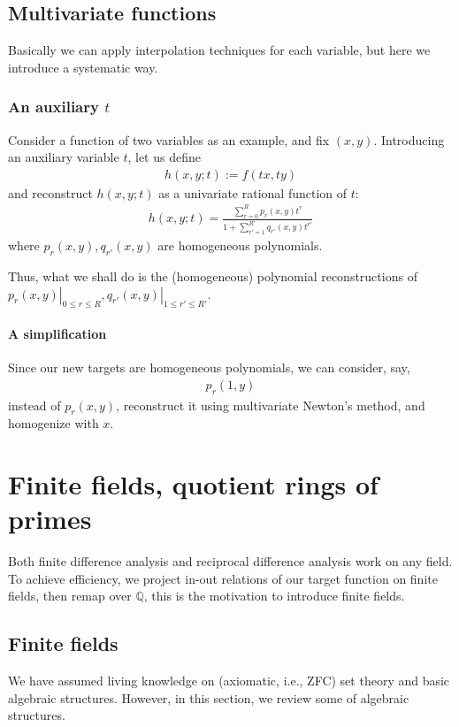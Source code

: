 \documentclass[11pt]{book}
\begin{document}
\section{Multivariate functions}
Basically we can apply interpolation techniques for each variable, but here we introduce a systematic way.

\subsection{An auxiliary $t$}
Consider a function of two variables as an example, and fix $(x,y)$.
Introducing an auxiliary variable $t$, let us define
\begin{eqnarray}
h(x,y;t) := f(tx, ty)
\end{eqnarray}
and reconstruct $h(x,y;t)$ as a univariate rational function of $t$:
\begin{eqnarray}
h(x,y;t) = \frac{\sum_{r=0}^R p_r(x,y) t^r}{1+ \sum_{r'=1}^{R'} q_{r'}(x,y) t^{r'}}
\end{eqnarray}
where $p_r(x,y), q_{r'}(x,y)$ are homogeneous polynomials.

Thus, what we shall do is the (homogeneous) polynomial reconstructions of $\left. p_r(x,y) \right|_{0 \leq r \leq R}, \left. q_{r'}(x,y) \right|_{1 \leq r' \leq R'}$.

\subsubsection{A simplification}
Since our new targets are homogeneous polynomials, we can consider, say,
\begin{eqnarray}
p_r(1, y)
\end{eqnarray}
instead of $p_r(x,y)$, reconstruct it using multivariate Newton's method, and homogenize with $x$.



\chapter{Finite fields, quotient rings of primes}
Both finite difference analysis and reciprocal difference analysis work on any field.
To achieve efficiency, we project in-out relations of our target function on finite fields, then remap over $\mathbb{Q}$, this is the motivation to introduce finite fields.

\section{Finite fields}
We have assumed living knowledge on (axiomatic, i.e., ZFC) set theory and basic algebraic structures.
However, in this section, we review some of algebraic structures.
\end{document}
